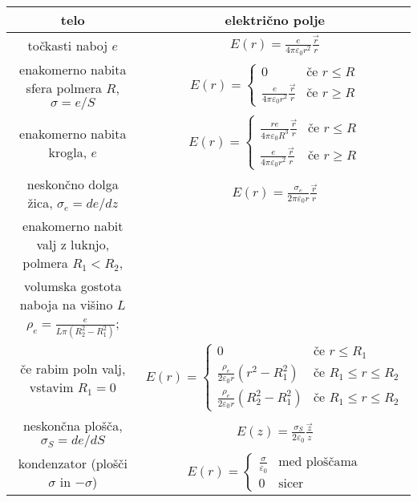 \documentclass[a4paper, oneside, 12pt]{article}
\theoremstyle{definition}
\newcommand{\vv}{\vec}
\newcommand{\eps}{\varepsilon}
\begin{document}
\begin{tabular}{c|c}
telo & električno polje\\ \hline \hline
točkasti naboj $e$ & $ E(r) = \frac{e}{4 \pi \eps_0 r^2} \frac{\vv{r}}{r}$ \\ \hline
enakomerno nabita sfera polmera $R$, $\sigma = e/S$ & $E(r) =
                                \begin{cases}
                                0 &\text{če } r \leq R\\
                                \frac{e}{4 \pi \eps_0 r^2} \frac{\vv{r}}{r} & \text{če } r \geq R \end{cases}$ \\ \hline
enakomerno nabita krogla, $e$ & $E(r) =
                                \begin{cases}
                                \frac{r e}{4 \pi \eps_0 R^3} \frac{\vv{r}}{r} &\text{če } r \leq R\\
                                \frac{e}{4 \pi \eps_0 r^2} \frac{\vv{r}}{r} & \text{če } r \geq R \end{cases}$ \\ \hline
neskončno dolga žica, $\sigma_e = de/dz$ & $E(r) = \frac{\sigma_e}{2 \pi \eps_0 r} \frac{\vv{r}}{r}$ \\ \hline
enakomerno nabit valj z luknjo, polmera $R_1 < R_2$,\\volumska gostota naboja na višino $L$ $\rho_e = \frac{e}{L \pi (R_2^2 - R_1^2)}$;\\če rabim poln valj, vstavim $R_1 = 0$ & $E(r) =
                                \begin{cases}
                                0 &\text{če } r \leq R_1\\
                                \frac{\rho_e}{2 \eps_0 r} (r^2 - R_1^2) &\text{če } R_1 \leq r \leq R_2\\
                                \frac{\rho_e}{2 \eps_0 r} (R_2^2 - R_1^2) &\text{če } R_1 \leq r \leq R_2 \end{cases} $\\ \hline
neskončna plošča, $\sigma_S = de/dS$ & $E(z) = \frac{\sigma_S}{2 \eps_0} \frac{\vv{z}}{z}$ \\ \hline
kondenzator (plošči $\sigma$ in $-\sigma$) & $E(r) =
                                \begin{cases}
                                \frac{\sigma}{\eps_0} & \text{med ploščama}\\
                                0 & \text{sicer} \end{cases}$ \\ \hline
\end{tabular}
\end{document}
